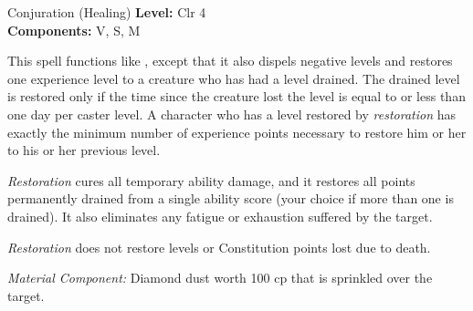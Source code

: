 {Conjuration (Healing)}
{
	\textbf{Level:}
	Clr 4\\
	\textbf{Components:}
	V, S, M\\
}
{
	This spell functions like , except that it also dispels negative levels and restores one experience level to a creature who has had a level drained. The drained level is restored only if the time since the creature lost the level is equal to or less than one day per caster level. A character who has a level restored by \emph{restoration} has exactly the minimum number of experience points necessary to restore him or her to his or her previous level.

	\emph{Restoration} cures all temporary ability damage, and it restores all points permanently drained from a single ability score (your choice if more than one is drained). It also eliminates any fatigue or exhaustion suffered by the target.

	\emph{Restoration} does not restore levels or Constitution points lost due to death.

	\textit{Material Component:}
	Diamond dust worth 100 cp that is sprinkled over the target.

}
